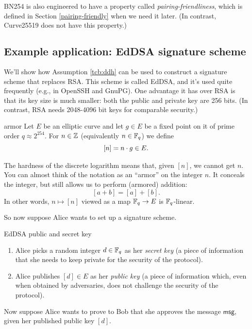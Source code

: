 BN254 is also engineered to have a property called
\emph{pairing-friendliness}, which is defined in Section \ref{pairing-friendly} when
we need it later. (In contrast, Curve25519 does not have this property.)

\subsection{Example application: EdDSA signature scheme}\label{eddsa}
We'll show how Assumption \ref{tcb:ddh} can be used to construct a
signature scheme that replaces RSA.
This scheme is called EdDSA,
and it's used quite frequently (e.g., in OpenSSH and GnuPG).
One advantage it has over RSA is that its key size is much smaller:
both the public and private key are 256 bits.
(In contrast, RSA needs 2048-4096 bit keys for comparable security.)

\begin{definition}{}{armor}
Let $E$ be an elliptic curve and let $g \in E$
be a fixed point on it of prime order $q \approx 2^{254}$.
For $n \in \mathbb{Z}$ (equivalently $n \in \mathbb{F}_q$) we define
\[ [n] \defeq n \cdot g \in E. \]
\end{definition}

The hardness of the discrete logarithm means that, given
$[n]$, we cannot get $n$. You can almost think of the
notation as an ``armor'' on the integer $n$. It conceals the integer,
but still allows us to perform (armored) addition:
\[ [a + b] = [a] + [b]. \] In other
words, $n \mapsto [n]$ viewed as a map
$\mathbb{F}_{q} \rightarrow E$ is $\mathbb{F}_{q}$-linear.

So now suppose Alice wants to set up a signature scheme.

\begin{algo}{EdDSA public and secret key}{}
\begin{enumerate}
\item
  Alice picks a random integer $d \in \mathbb{F}_{q}$ as her
  \emph{secret key} (a piece of information that she needs to keep
  private for the security of the protocol).
\item
  Alice publishes $[d] \in E$ as her \emph{public key} (a
  piece of information which, even when obtained by adversaries, does
  not challenge the security of the protocol).
\end{enumerate}
\end{algo}

Now suppose Alice wants to prove to Bob that she approves the message
$\textsf{msg}$, given her published public key
$[d]$.

